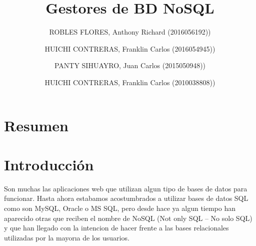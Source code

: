 \documentclass[preprint,12pt]{elsarticle}
\begin{document}
	
	\begin{frontmatter} 

		\title{\huge Gestores de BD NoSQL}
		
		\author{ROBLES FLORES, Anthony Richard     (2016056192))}
		\author{HUICHI CONTRERAS, Franklin Carlos          	(2016054945))}
		\author{PANTY SIHUAYRO, Juan Carlos         	(2015050948))}  
		\author{HUICHI CONTRERAS, Franklin Carlos                (2010038808))} 
		\address{Escuela Profesional de Ingeniería de Sistemas}
		\address{Universidad Privada de Tacna}
		\address{Tacna, Perú}
		

		\begin{abstract}
		


		\end{abstract}


	\end{frontmatter}


\section{Resumen}






\section{Introducción} 
Son muchas las aplicaciones web que utilizan algun
tipo de bases de datos para funcionar. Hasta ahora
estabamos acostumbrados a utilizar bases de datos SQL
como son MySQL, Oracle o MS SQL, pero desde hace
ya algun tiempo han aparecido otras que reciben el nombre de NoSQL (Not only SQL – No solo SQL) y que
han llegado con la intencion de hacer frente a las bases
relacionales utilizadas por la mayorıa de los usuarios.
\end{document}
